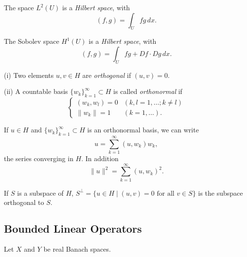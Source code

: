 \begin{example}
\label{ex:l2-hilbert-space-example}
The space $L^2(U)$ is a \textit{Hilbert space}, with
$$(f, g) = \int_U fg \, dx.$$
\end{example}

\begin{example}
\label{ex:h1-hilbert-space-example}
The Sobolev space $H^1(U)$ is a \textit{Hilbert space}, with
$$(f, g) = \int_U fg + Df \cdot Dg \, dx.$$
\end{example}

\begin{definition}
\label{def:orthogonal-orthonormal-basis}
(i) Two elements $u, v \in H$ are \textit{orthogonal} if $(u,v) = 0$.

(ii) A countable basis $\{w_k\}_{k=1}^{\infty} \subset H$ is called \textit{orthonormal} if
$$\begin{cases} (w_k, w_l) = 0 & (k,l = 1, \ldots; k \neq l) \\ \|w_k\| = 1 & (k = 1, \ldots). \end{cases}$$

If $u \in H$ and $\{w_k\}_{k=1}^{\infty} \subset H$ is an orthonormal basis, we can write
$$u = \sum_{k=1}^{\infty} (u, w_k) w_k,$$
the series converging in $H$. In addition
$$\|u\|^2 = \sum_{k=1}^{\infty} (u, w_k)^2.$$
\end{definition}

\begin{definition}
\label{def:orthogonal-complement-subspace}
If $S$ is a subspace of $H$, $S^{\perp} = \{u \in H \mid (u,v) = 0 \text{ for all } v \in S\}$ is the subspace orthogonal to $S$.
\end{definition}

\subsection{Bounded Linear Operators}
\label{sec:bounded-linear-operators}

Let $X$ and $Y$ be real Banach spaces.

